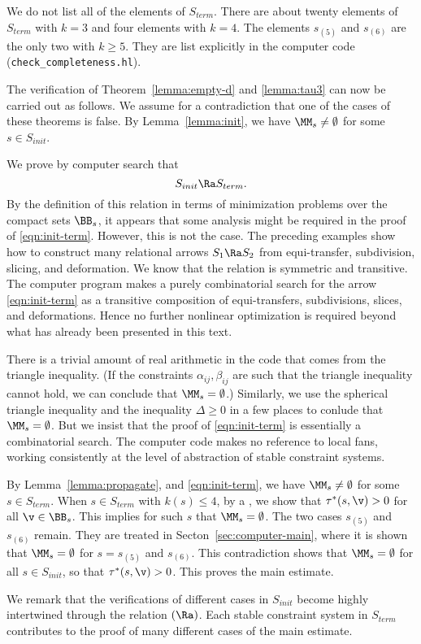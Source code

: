 We do not list all of the elements of $S_{term}$.  There are about twenty
elements of $S_{term}$ with $k=3$ and four elements with $k=4$.  The elements
$s_{(5)}$ and $s_{(6)}$ are the only two with $k\ge 5$.
They are list explicitly
in the computer code (\verb!check_completeness.hl!).



\begin{remark}
The verification of 
Theorem~\ref{lemma:empty-d} and \ref{lemma:tau3} can now be
carried out as follows.  We assume for a contradiction that
one of the cases of these theorems is false.  By Lemma~\ref{lemma:init}, we have
$\MM_s\ne\emptyset$ for some $s\in S_{init}$.  

We prove by computer search
 that 
\begin{equation}\label{eqn:init-term}
S_{init}\Ra S_{term}.
\end{equation}
   By the definition of this
relation in terms of minimization problems over the compact sets
$\BB_s$,
it appears that some analysis might be required in the proof
of \eqref{eqn:init-term}.  However, this is not the case.  The
preceding
examples show how to construct many relational arrows $S_1\Ra S_2$
from equi-transfer, subdivision, slicing, and deformation.
We know that the relation is symmetric and transitive.   The computer
program makes a purely combinatorial search for the arrow
\eqref{eqn:init-term}
as a transitive composition of equi-transfers, subdivisions, slices,
and
deformations.  Hence no further nonlinear optimization is required
beyond
what has already been presented in this text.

There is a trivial amount of real arithmetic in the code that comes
from the triangle inequality.   (If
the constraints $\alpha_{ij},\beta_{ij}$ are such that the triangle
inequality cannot hold, we can conclude that $\MM_s=\emptyset$.)
Similarly, we use the spherical triangle inequality and the inequality
$\Delta\ge0$ in a few places to conlude that $\MM_s=\emptyset$.
But we insist that the proof of \eqref{eqn:init-term} is essentially
a combinatorial search.  The computer code makes no reference
to local fans, working consistently at the level of abstraction of stable
constraint
systems.


By Lemma~\ref{lemma:propagate}, and \eqref{eqn:init-term}, we have
$\MM_s\ne\emptyset$ for some $s\in S_{term}$.  When $s\in S_{term}$
with $k(s)\le 4$, by a , we show
that $\tau^*(s,\v) >0$ for all $\v\in \BB_s$.  This implies for such $s$
that $\MM_s=\emptyset$.  The two cases $s_{(5)}$ and $s_{(6)}$ remain.
They are treated in Secton~\ref{sec:computer-main}, where it is shown
that $\MM_s=\emptyset$ for $ s=s_{(5)}$ and $s_{(6)}$.  This
contradiction shows that $\MM_s=\emptyset$ for all $s\in S_{init}$,
so that $\tau^*(s,\v)>0$.  This proves the main estimate.

We remark that the verifications of  different cases in $S_{init}$ become
highly intertwined through the relation $(\Ra)$.  Each stable
constraint
system in $S_{term}$ contributes to the proof of many different cases
of the main estimate.
\end{remark}
